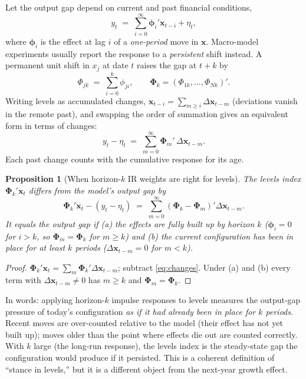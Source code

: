 \documentclass[11pt]{article}
\newtheorem{proposition}{Proposition}
\theoremstyle{definition}
\theoremstyle{remark}
\newcommand{\bx}{\mathbf{x}}
\newcommand{\bphi}{\boldsymbol{\phi}}
\newcommand{\bPhi}{\boldsymbol{\Phi}}
\begin{document}
Let the output gap depend on current and past financial conditions,
\begin{equation}\label{eq:dyn}
y_t \;=\; \sum_{i=0}^{\infty}\bphi_i'\bx_{t-i} + \eta_t ,
\end{equation}
where $\bphi_i$ is the effect at lag $i$ of a \emph{one-period} move in $\bx$. Macro-model experiments usually report the response to a \emph{persistent} shift instead. A permanent unit shift in $x_j$ at date $t$ raises the gap at $t+k$ by
\[
\Phi_{jk} \;=\; \sum_{i=0}^{k}\phi_{ji} ,\qquad \bPhi_k=(\Phi_{1k},\dots,\Phi_{Nk})' .
\]
Writing levels as accumulated changes, $\bx_{t-i}=\sum_{m\ge i}\Delta\bx_{t-m}$ (deviations vanish in the remote past), and swapping the order of summation gives an equivalent form in terms of changes:
\begin{equation}\label{eq:changes}
y_t-\eta_t \;=\; \sum_{m=0}^{\infty}\bPhi_m'\,\Delta\bx_{t-m}.
\end{equation}
Each past change counts with the cumulative response for its age.

\begin{proposition}[When horizon-$k$ IR weights are right for levels]\label{prop:levels}
The levels index $\bPhi_k'\bx_t$ differs from the model's output gap by
\begin{equation}\label{eq:levelerr}
\bPhi_k'\bx_t - (y_t-\eta_t) \;=\; \sum_{m=0}^{\infty}(\bPhi_k-\bPhi_m)'\Delta\bx_{t-m}.
\end{equation}
It equals the output gap if (a) the effects are fully built up by horizon $k$ ($\bphi_i=0$ for $i>k$, so $\bPhi_m=\bPhi_k$ for $m\ge k$) and (b) the current configuration has been in place for at least $k$ periods ($\Delta\bx_{t-m}=0$ for $m<k$).
\end{proposition}

\begin{proof}
$\bPhi_k'\bx_t=\sum_m\bPhi_k'\Delta\bx_{t-m}$; subtract \eqref{eq:changes}. Under (a) and (b) every term with $\Delta\bx_{t-m}\neq 0$ has $m\ge k$ and $\bPhi_m=\bPhi_k$.
\end{proof}

\noindent In words: applying horizon-$k$ impulse responses to levels measures the output-gap pressure of today's configuration \emph{as if it had already been in place for $k$ periods}. Recent moves are over-counted relative to the model (their effect has not yet built up); moves older than the point where effects die out are counted correctly. With $k$ large (the long-run response), the levels index is the steady-state gap the configuration would produce if it persisted. This is a coherent definition of ``stance in levels,'' but it is a different object from the next-year growth effect.
\end{document}
